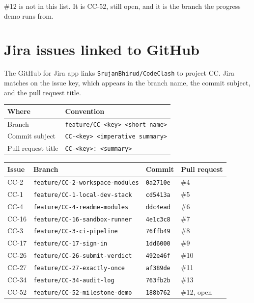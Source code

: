 \documentclass[11pt,a4paper]{article}
\begin{document}
\#12 is not in this list. It is CC-52, still open, and it is the branch the progress demo runs from.

\section{Jira issues linked to GitHub}
\label{sec:links}

The GitHub for Jira app links \texttt{SrujanBhirud/CodeClash} to project CC. Jira matches on the issue key, which appears in the branch name, the commit subject, and the pull request title.

\begin{center}
\small
\begin{tabularx}{\textwidth}{@{}l Y@{}}
\toprule
{} Where & Convention \\
\midrule
Branch & \texttt{feature/CC-<key>-<short-name>} \\
Commit subject & \texttt{CC-<key> <imperative summary>} \\
Pull request title & \texttt{CC-<key>: <summary>} \\
\bottomrule
\end{tabularx}
\end{center}

\begin{center}
\small
\begin{tabularx}{\textwidth}{@{}l Y l l@{}}
\toprule
{} Issue & Branch & Commit & Pull request \\
\midrule
CC-2 & \texttt{feature/CC-2-workspace-modules} & \texttt{0a2710e} & \#4 \\
CC-1 & \texttt{feature/CC-1-local-dev-stack} & \texttt{cd5413a} & \#5 \\
CC-4 & \texttt{feature/CC-4-readme-modules} & \texttt{ddc4ead} & \#6 \\
CC-16 & \texttt{feature/CC-16-sandbox-runner} & \texttt{4e1c3c8} & \#7 \\
CC-3 & \texttt{feature/CC-3-ci-pipeline} & \texttt{76ffb49} & \#8 \\
CC-17 & \texttt{feature/CC-17-sign-in} & \texttt{1dd6000} & \#9 \\
CC-26 & \texttt{feature/CC-26-submit-verdict} & \texttt{492e46f} & \#10 \\
CC-27 & \texttt{feature/CC-27-exactly-once} & \texttt{af389de} & \#11 \\
CC-34 & \texttt{feature/CC-34-audit-log} & \texttt{763fb2b} & \#13 \\
CC-52 & \texttt{feature/CC-52-milestone-demo} & \texttt{188b762} & \#12, open \\
\bottomrule
\end{tabularx}
\end{center}
\end{document}
